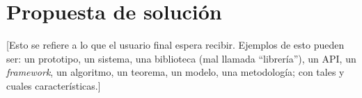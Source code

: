 \section{Propuesta de solución}

[Esto se refiere a lo que el usuario final espera recibir.
Ejemplos de esto pueden ser: un prototipo, un sistema, una biblioteca  (mal llamada ``librería''), un API, un \textit{framework}, un algoritmo, un teorema, un modelo, una metodología; con tales y cuales características.]

